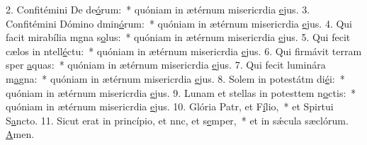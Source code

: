 2. Confitémini De de\uline{ó}rum:~* quóniam in ætérnum misericrdia \uline{e}jus.
3. Confitémini Dómino dmin\uline{ó}rum:~* quóniam in ætérnum misericrdia \uline{e}jus.
4. Qui facit mirabília mgna s\uline{o}lus:~* quóniam in ætérnum misericrdia \uline{e}jus.
5. Qui fecit cælos in ntell\uline{é}ctu:~* quóniam in ætérnum misericrdia \uline{e}jus.
6. Qui firmávit terram sper \uline{a}quas:~* quóniam in ætérnum misericrdia \uline{e}jus.
7. Qui fecit luminára m\uline{a}gna:~* quóniam in ætérnum misericrdia \uline{e}jus.
8. Solem in potestátm di\uline{é}i:~* quóniam in ætérnum misericrdia \uline{e}jus.
9. Lunam et stellas in potesttem n\uline{o}ctis:~* quóniam in ætérnum misericrdia \uline{e}jus.
10. Glória Patr, et F\uline{í}lio,~* et Spirtui S\uline{a}ncto.
11. Sicut erat in princípio, et nnc, et s\uline{e}mper,~* et in sǽcula sæclórum. \uline{A}men.
